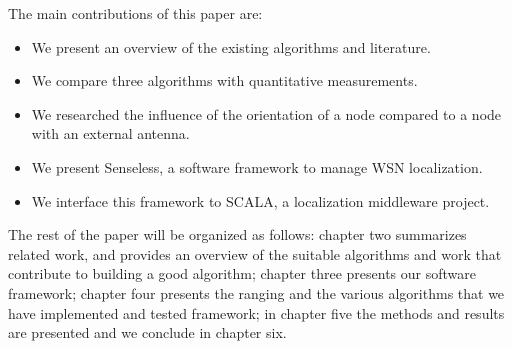 The main contributions of this paper are: 
\begin{itemize}
	\item We present an overview of the existing algorithms and literature. 
	\item We compare three algorithms with quantitative measurements. 
	\item We researched the influence of the orientation of a node compared to a node with an external antenna.
	\item We present Senseless, a software framework to manage WSN localization.
	\item We interface this framework to SCALA, a localization middleware project. 
\end{itemize}

The rest of the paper will be organized as follows: chapter two summarizes related work, and provides an overview of the suitable algorithms and work that contribute to building a good algorithm; chapter three presents our software framework; chapter four presents the ranging and the various algorithms that we have implemented and tested framework; in chapter five the methods and results are presented and we conclude in chapter six. 